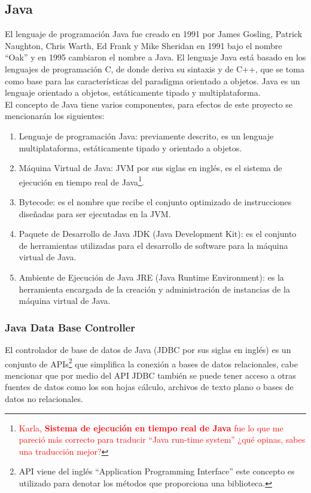 \subsection{Java}\label{sec-java}

El lenguaje de programación Java fue creado en 1991 por James Gosling, Patrick Naughton, Chris Warth, Ed Frank y Mike Sheridan en 1991 bajo el nombre ``Oak'' y en 1995 cambiaron el nombre a Java. El lenguaje Java está basado en los lenguajes de programación C, de donde deriva su sintaxis y de C++, que se toma como base para las características del paradigma orientado a objetos. Java es un lenguaje orientado a objetos, estáticamente tipado y multiplataforma\cite{JavaCompleteReference, WellGroundedJavaDeveloper}.\\
El concepto de Java tiene varios componentes, para efectos de este proyecto se mencionarán los siguientes\cite{JavaCompleteReference, WellGroundedJavaDeveloper}:
\begin{enumerate}
	\item Lenguaje de programación Java: previamente descrito, es un lenguaje multiplataforma, estáticamente tipado y orientado a objetos.
	\item Máquina Virtual de Java: JVM por sus siglas en inglés, es el sistema de ejecución en tiempo real de Java\footnote{\textcolor{red}{Karla, \textbf{Sistema de ejecución en tiempo real de Java} fue lo que me pareció más correcto para traducir ``Java run-time system'' ¿qué opinas, sabes una traducción mejor?}}.
	\item Bytecode: es el nombre que recibe el conjunto optimizado de instrucciones diseñadas para ser ejecutadas en la JVM.
	\item Paquete de Desarrollo de Java JDK (Java Development Kit): es el conjunto de herramientas utilizadas para el desarrollo de software para la máquina virtual de Java.
	\item Ambiente de Ejecución de Java JRE (Java Runtime Environment): es la herramienta encargada de la creación y administración de instancias de la máquina virtual de Java.
\end{enumerate}

\subsubsection{Java Data Base Controller}\label{sec-jdbc}
El controlador de base de datos de Java (JDBC por sus siglas en inglés) es un conjunto de APIs\footnote{API viene del inglés ``Application Programming Interface'' este concepto es utilizado para denotar los métodos que proporciona una biblioteca.} que simplifica la conexión a bases de datos relacionales, cabe mencionar que por medio del API JDBC también se puede tener acceso a otras fuentes de datos como los son hojas cálculo, archivos de texto plano o bases de datos no relacionales\cite{JDBCRecipes, BeginingJava8APIs}.

